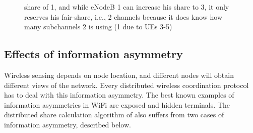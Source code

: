 \begin{figure}[htb!]
{share of 1, and while eNodeB 1 can increase his share to 3, it only reserves his fair-share, i.e., 2
channels because it does know how many subchannels 2 is using (1 due to UEs 3-5)}
  \label{fig:asym}
\end{figure}


\subsection{Effects of information asymmetry}
\label{sec:asymmetry}


Wireless sensing depends on node location, and different nodes will obtain different views of the network. 
Every distributed wireless coordination protocol has to deal with this information asymmetry. 
The best known examples of information asymmetries in WiFi are exposed and hidden terminals. 
The distributed share calculation algorithm of \cf also suffers from two cases of information asymmetry, 
described below. 





